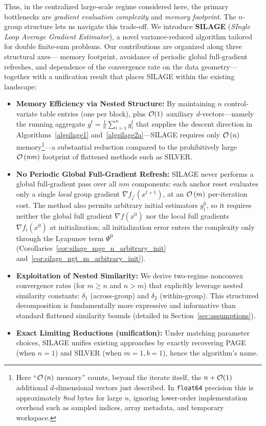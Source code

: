 \documentclass{article}
\newcommand{\cO}{{\cal O}}
\newcommand{\rb}[1]{\left(#1\right)}
\theoremstyle{plain}
\newcommand{\algname}[1]{{\sf\scalefont{0.88}\color{mydarkgreen}#1}\xspace}
\def\algname#1{#1}%
\begin{document}
Thus, in the centralized large-scale regime considered here, the primary bottlenecks are \emph{gradient evaluation complexity} and \emph{memory footprint}. The $n$-group structure lets us navigate this trade-off. We introduce \textbf{\algname{SILAGE}} (\emph{SIngle Loop Average Gradient Estimator}), a novel variance-reduced algorithm tailored for double finite-sum problems. Our contributions are organized along three structural axes--- memory footprint,  avoidance of periodic global full-gradient refreshes, and  dependence of the convergence rate on the data geometry---together with a unification result that places \algname{SILAGE} within the existing landscape:
\begin{itemize}%
    \item \textbf{Memory Efficiency via Nested Structure:} By maintaining $n$ control-variate table entries (one per block), plus $\cO(1)$ auxiliary $d$-vectors---namely the running aggregate $g^t=\frac{1}{n}\sum_{i=1}^n g_i^t$ that supplies the descent direction in Algorithms~\ref{algsilage1} and~\ref{algsilage2a}---\algname{SILAGE} requires only $\cO\rb{n}$ memory\footnote{Here ``$\cO\rb{n}$ memory'' counts, beyond the iterate itself, the $n+\cO(1)$ additional $d$-dimensional vectors just described. In \texttt{float64} precision this is approximately $8nd$ bytes for large $n$, ignoring lower-order implementation overhead such as sampled indices, array metadata, and temporary workspace.}---a substantial reduction compared to the prohibitively large $\cO\rb{nm}$ footprint of flattened methods such as \algname{SILVER}.
    \item \textbf{No Periodic Global Full-Gradient Refresh:} \algname{SILAGE} never performs a global full-gradient pass over all $nm$ components: each anchor reset evaluates only a single \emph{local} group gradient $\nabla f_{i^t}(x^{t+1})$, at an $\cO\rb{m}$ per-iteration cost. The method also permits arbitrary initial estimators $g_i^0$, so it requires neither the global full gradient $\nabla f(x^0)$ nor the local full gradients $\nabla f_i(x^0)$ at initialization; all initialization error enters the complexity only through the Lyapunov term $\Psi^0$ (Corollaries~\ref{cor:silage_mge_n_arbitrary_init} and~\ref{cor:silage_ngt_m_arbitrary_init}).
    \item \textbf{Exploitation of Nested Similarity:} We derive two-regime nonconvex convergence rates (for $m \ge n$ and $n > m$) that explicitly leverage nested similarity constants: $\delta_1$ (across-group) and $\delta_2$ (within-group). This structured decomposition is fundamentally more expressive and informative than standard flattened similarity bounds (detailed in Section~\ref{sec:assumptions}).
    \item \textbf{Exact Limiting Reductions (unification):} Under matching parameter choices, \algname{SILAGE} unifies existing approaches by exactly recovering \algname{PAGE} (when $n=1$) and \algname{SILVER} (when $m=1, b=1$), hence the algorithm's name.
\end{itemize}
\end{document}
